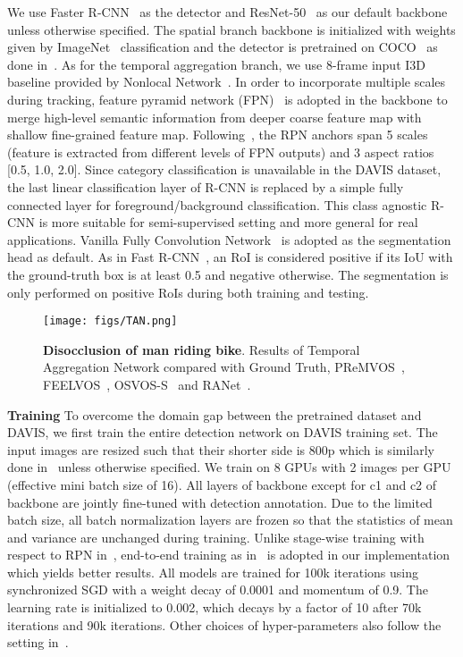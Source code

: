 \documentclass[10pt,twocolumn,letterpaper]{article}
\begin{document}
We use Faster R-CNN~\cite{ren2015faster} as the detector and ResNet-50~\cite{he2016resnet} as our default backbone unless otherwise specified.
The spatial branch backbone is initialized with weights given by ImageNet~\cite{deng2009imagenet} classification and the detector is pretrained on COCO~\cite{lin2014coco} as done in~\cite{luiten2018premvos}.
As for the temporal aggregation branch, we use 8-frame input I3D baseline provided by Nonlocal Network~\cite{wang2018nonlocal}.
In order to incorporate multiple scales during tracking,
feature pyramid network (FPN)~\cite{lin2017fpn} is adopted in the backbone to merge high-level semantic information from deeper coarse feature map with  shallow fine-grained feature map.
Following~\cite{lin2017fpn}, the RPN anchors span 5 scales (feature is extracted from different levels of FPN outputs) and 3 aspect ratios [0.5, 1.0, 2.0].
Since category classification is unavailable in the DAVIS dataset, the last linear classification layer of R-CNN is replaced by a simple fully connected layer for foreground/background classification.
This class agnostic R-CNN is more suitable for semi-supervised setting and more general for real applications.
Vanilla Fully Convolution Network~\cite{long2015fcn} is adopted as the segmentation head as default.
As in Fast R-CNN~\cite{girshick2015fast}, an RoI is considered positive if its IoU with the ground-truth box is at least 0.5 and negative otherwise.
The segmentation is only performed on positive RoIs during both training and testing.

\begin{figure}[t]
\begin{center}
   \texttt{[image: figs/TAN.png]}
\end{center}
\caption{{\bf Disocclusion of man riding bike}. Results of Temporal Aggregation Network compared with Ground Truth, PReMVOS~\cite{luiten2018premvos}, FEELVOS~\cite{voigtlaender2019feelvos}, OSVOS-S~\cite{caelles2017osvos} and RANet~\cite{wang2019ranet}.}
\label{fig:tan}
\end{figure}

\textbf{Training}
To overcome the domain gap between the pretrained dataset and DAVIS, we first train the entire detection network on DAVIS training set.
The  input  images  are  resized  such  that  their  shorter  side  is  800p which is similarly done in~\cite{ren2015faster} unless otherwise specified.
We train on 8 GPUs with 2 images per GPU (effective mini batch size of 16).
All layers of backbone except for c1 and c2 of backbone are jointly fine-tuned with detection annotation.
Due to the limited batch size, all batch normalization layers are frozen so that the statistics of mean and variance are unchanged during training.
Unlike stage-wise training with respect to RPN in~\cite{he2017mask}, end-to-end  training  as in~\cite{lin2017fpn} is adopted in our implementation which yields better results.
All models are trained for 100k iterations using synchronized SGD with a weight decay of 0.0001 and momentum of 0.9.
The learning rate is initialized to 0.002, which decays by a factor of 10 after 70k iterations and 90k iterations.
Other choices of hyper-parameters also follow the setting in~\cite{ren2015faster}.
\end{document}
